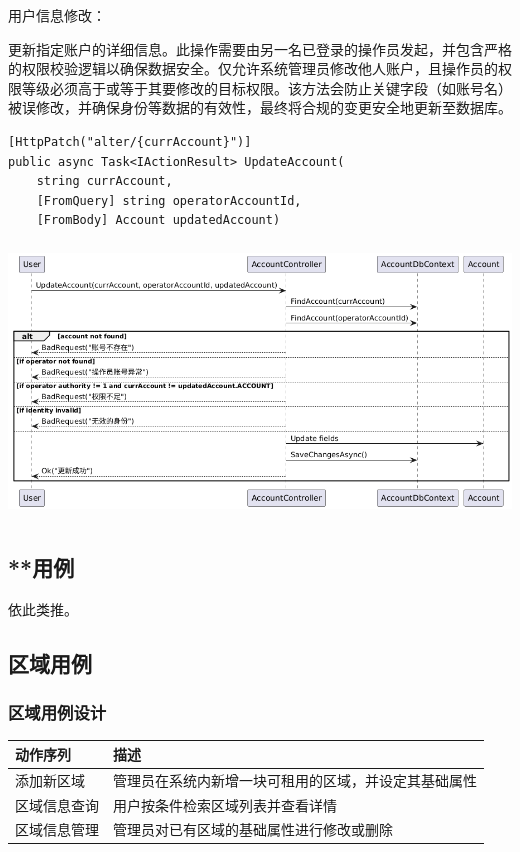 \documentclass[]{article}
\let\oldincludegraphics\includegraphics
\renewcommand{\includegraphics}[2][]{%
  \begin{center}\oldincludegraphics[#1]{#2}\end{center}%
}
\begin{document}
用户信息修改：

更新指定账户的详细信息。此操作需要由另一名已登录的操作员发起，并包含严格的权限校验逻辑以确保数据安全。仅允许系统管理员修改他人账户，且操作员的权限等级必须高于或等于其要修改的目标权限。该方法会防止关键字段（如账号名）被误修改，并确保身份等数据的有效性，最终将合规的变更安全地更新至数据库。
\begin{verbatim}
[HttpPatch("alter/{currAccount}")]
public async Task<IActionResult> UpdateAccount(
    string currAccount,
    [FromQuery] string operatorAccountId,
    [FromBody] Account updatedAccount)
\end{verbatim}

\includegraphics[width=5.64167in,height=2.86458in]{media/media/image7.png}

\hypertarget{ux7528ux4f8b}{%
  \subsection{**用例}\label{ux7528ux4f8b}}

依此类推。

\hypertarget{ux7528ux4f8b-1}{%
  \subsection{区域用例}\label{ux7528ux4f8b-1}}
\hypertarget{ux7528ux4f8b-1ux8bbeux8ba1}{%
  \subsubsection{区域用例设计}\label{ux7528ux4f8b-1ux8bbeux8ba1}}


\begin{longtable}[]{@{}ll@{}}
  \toprule
  \textbf{动作序列} & \textbf{描述}                \\
  \midrule
  \endhead
  添加新区域         & 管理员在系统内新增一块可租用的区域，并设定其基础属性 \\
  区域信息查询        & 用户按条件检索区域列表并查看详情           \\
  区域信息管理        & 管理员对已有区域的基础属性进行修改或删除       \\
  \bottomrule
\end{longtable}
\end{document}
